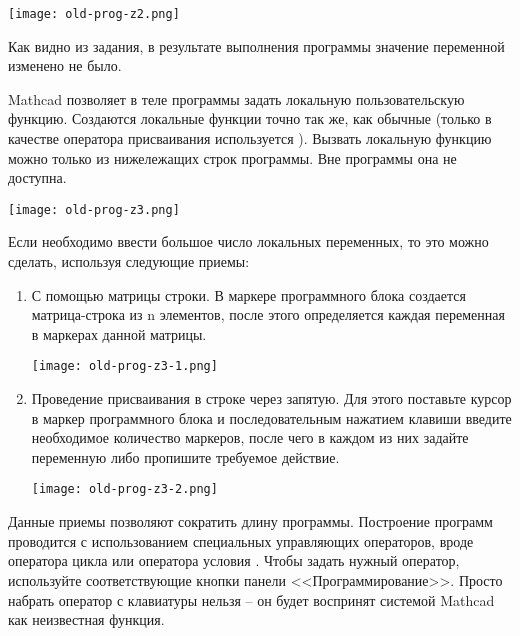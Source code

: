 \begin{center}
	\texttt{[image: old-prog-z2.png]}
\end{center}

Как видно из задания, в результате выполнения программы значение переменной  изменено не было.

Mathcad позволяет в теле программы задать локальную пользовательскую функцию. Создаются локальные функции точно так же, как обычные (только в качестве оператора присваивания используется ). Вызвать локальную функцию можно только из нижележащих строк программы. Вне программы она не доступна.

\begin{center}
	\texttt{[image: old-prog-z3.png]}
\end{center}

Если необходимо ввести большое число локальных переменных, то это можно сделать, используя следующие приемы:
\begin{enumerate}
	\item С помощью матрицы строки. В маркере программного блока создается матрица-строка из n элементов, после этого определяется каждая переменная в маркерах данной матрицы.
	\begin{center}
		\texttt{[image: old-prog-z3-1.png]}
	\end{center}
	
	\item Проведение присваивания в строке через запятую. Для этого поставьте курсор в маркер программного блока и последовательным нажатием клавиши \keys{,} введите необходимое количество маркеров, после чего в каждом из них задайте переменную либо пропишите требуемое действие.
	\begin{center}
		\texttt{[image: old-prog-z3-2.png]}
	\end{center}
	
\end{enumerate}

Данные приемы позволяют сократить длину программы.
Построение программ проводится с использованием специальных управляющих операторов, вроде оператора цикла  или оператора условия . Чтобы задать нужный оператор, используйте соответствующие кнопки панели <<Программирование>>. Просто набрать оператор с клавиатуры нельзя – он будет воспринят системой Mathcad как неизвестная функция.

